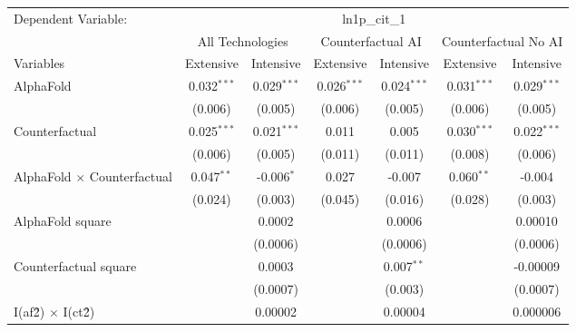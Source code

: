\begingroup
\centering
\begin{tabular}{lcccccc}
   \tabularnewline \midrule \midrule
   Dependent Variable: & \multicolumn{6}{c}{ln1p\_cit\_1}\\
 & \multicolumn{2}{c}{All Technologies} & \multicolumn{2}{c}{Counterfactual AI} & \multicolumn{2}{c}{Counterfactual No AI} \\
\cmidrule(lr){1-1}\cmidrule(lr){2-3} \cmidrule(lr){4-5} \cmidrule(lr){6-7}
Variables & \multicolumn{1}{c}{Extensive} & \multicolumn{1}{c}{Intensive} & \multicolumn{1}{c}{Extensive} & \multicolumn{1}{c}{Intensive} & \multicolumn{1}{c}{Extensive} & \multicolumn{1}{c}{Intensive} \\
\cmidrule(lr){1-1}\cmidrule(lr){2-2} \cmidrule(lr){3-3} \cmidrule(lr){4-4} \cmidrule(lr){5-5} \cmidrule(lr){6-6} \cmidrule(lr){7-7}
   AlphaFold                          & 0.032$^{***}$ & 0.029$^{***}$ & 0.026$^{***}$ & 0.024$^{***}$ & 0.031$^{***}$ & 0.029$^{***}$\\   
                                      & (0.006)       & (0.005)       & (0.006)       & (0.005)       & (0.006)       & (0.005)\\   
   Counterfactual                     & 0.025$^{***}$ & 0.021$^{***}$ & 0.011         & 0.005         & 0.030$^{***}$ & 0.022$^{***}$\\   
                                      & (0.006)       & (0.005)       & (0.011)       & (0.011)       & (0.008)       & (0.006)\\   
   AlphaFold $\times$ Counterfactual  & 0.047$^{**}$  & -0.006$^{*}$  & 0.027         & -0.007        & 0.060$^{**}$  & -0.004\\   
                                      & (0.024)       & (0.003)       & (0.045)       & (0.016)       & (0.028)       & (0.003)\\   
   AlphaFold square                   &               & 0.0002        &               & 0.0006        &               & 0.00010\\   
                                      &               & (0.0006)      &               & (0.0006)      &               & (0.0006)\\   
   Counterfactual square              &               & 0.0003        &               & 0.007$^{**}$  &               & -0.00009\\   
                                      &               & (0.0007)      &               & (0.003)       &               & (0.0007)\\   
   I(af\^2) $\times$ I(ct\^2)         &               & 0.00002       &               & 0.00004       &               & 0.000006\\   

\end{tabular}
